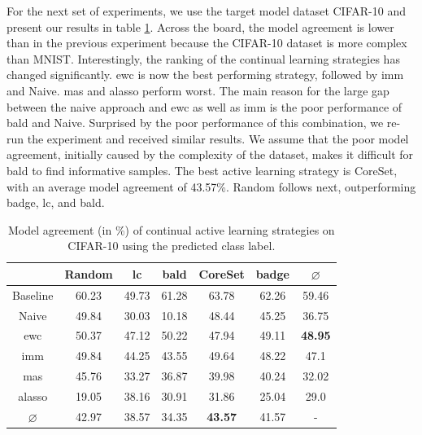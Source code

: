 For the next set of experiments, we use the target model dataset CIFAR-10 and present our results in table \ref{fig:ModelStealingCIFAR10Label}. 
Across the board, the model agreement is lower than in the previous experiment because the CIFAR-10 dataset is more complex than MNIST. Interestingly, the ranking of
the continual learning strategies has changed significantly. \gls{ewc} is now the best performing strategy, followed by \gls{imm} and Naive. \gls{mas} and \gls{alasso}
perform worst. The main reason for the large gap between the naive approach and \gls{ewc} as well as \gls{imm} is the poor performance of \gls{bald} and Naive.
Surprised by the poor performance of this combination, we re-run the experiment and received similar results. We assume that the poor model agreement, initially
caused by the complexity of the dataset, makes it difficult for \gls{bald} to find informative samples. The best active learning strategy is CoreSet, with an average
model agreement of 43.57\%. Random follows next, outperforming \gls{badge}, \gls{lc}, and \gls{bald}. \par

\begin{table}[h]
    \centering
    \begin{tabular}{ c | c c c c c | c } 
         & Random & \gls{lc} & \gls{bald} & CoreSet & \gls{badge} & $\varnothing$\\ 
        \hline
        Baseline & 60.23 & 49.73 & 61.28 & 63.78 & 62.26 & 59.46\\
        \hline
        Naive & 49.84 & 30.03 & 10.18 & 48.44 & 45.25 & 36.75\\
        \gls{ewc} & 50.37 & 47.12 & 50.22 & 47.94 & 49.11 & \textbf{48.95} \\
        \gls{imm} & 49.84 & 44.25 & 43.55 & 49.64 & 48.22 & 47.1\\
        \gls{mas} & 45.76 & 33.27 & 36.87 & 39.98 & 40.24 & 32.02\\
        \gls{alasso} & 19.05 & 38.16 & 30.91 & 31.86 & 25.04 & 29.0\\
        \hline
        $\varnothing$ & 42.97 & 38.57 & 34.35 & \textbf{43.57} & 41.57 & -\\
    \end{tabular}
    \caption{Model agreement (in \%) of continual active learning strategies on CIFAR-10 using the predicted class label.}
    \label{fig:ModelStealingCIFAR10Label}
\end{table}


